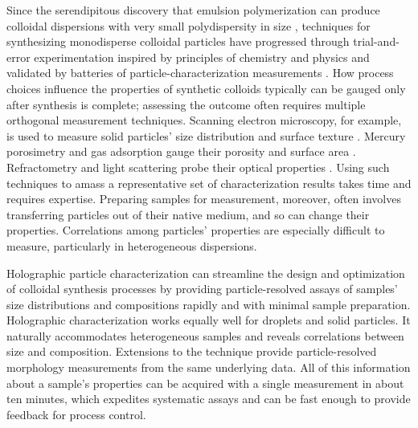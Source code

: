 \documentclass[journal=langd5,manuscript=article]{achemso}
\begin{document}
Since the serendipitous discovery that emulsion polymerization
can produce colloidal dispersions with very small polydispersity
in size
\cite{backus1949small,gerould1950comments},
techniques for synthesizing
monodisperse colloidal particles have progressed
through trial-and-error experimentation
inspired by principles of chemistry and physics 
and validated by batteries of particle-characterization
measurements 
\cite{vanderhoff1956some,stober1968controlled,kotera1970colloid,dezelic1970preparation,goodwin1974studies,antl1986preparation}.
How process choices influence the properties of synthetic colloids
typically can be gauged only after
synthesis is complete;
assessing the outcome often requires
multiple orthogonal measurement techniques.
Scanning electron microscopy, for example, is used to measure
solid particles' size distribution and surface texture \cite{yamada85}.
Mercury porosimetry and gas adsorption gauge their porosity
\cite{giesche2006mercury} and surface area \cite{rouquerol1994}. 
Refractometry and light scattering probe their optical properties
\cite{chou54}.
Using such techniques to amass a representative 
set of characterization results
takes time and requires expertise.
Preparing samples for measurement, moreover, often involves
transferring particles out of their native medium,
and so can change their properties.
Correlations among particles' properties are especially
difficult to measure, particularly in heterogeneous
dispersions.

Holographic particle characterization can streamline
the design and optimization of colloidal synthesis processes
by providing particle-resolved assays of samples' size distributions
and compositions rapidly and with minimal sample preparation.
Holographic characterization works equally
well for droplets and solid particles. It naturally accommodates heterogeneous
samples and reveals correlations between size and composition. Extensions to the technique
provide particle-resolved morphology measurements from the same underlying data.
All of this information about a sample's properties can be acquired with a
single measurement in about ten minutes, which
expedites systematic assays and can be fast enough to provide feedback
for process control.
\end{document}
